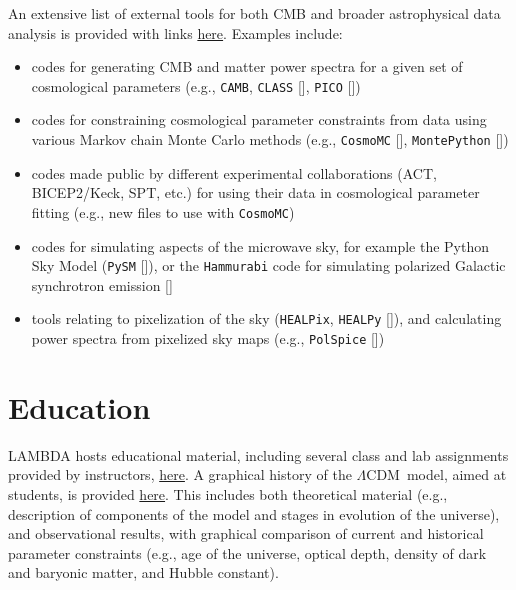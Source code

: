 \documentclass[letter]{emulateapj}
\newcommand{\lcdm}{\ensuremath{\Lambda\mathrm{CDM}}}
\begin{document}
An extensive list of external tools for both CMB and broader astrophysical data analysis is provided with links \href{https://lambda.gsfc.nasa.gov/toolbox/}{here}. Examples include:
\begin{itemize}
    \item codes for generating CMB and matter power spectra for a given set of cosmological parameters (e.g., \texttt{CAMB}, \texttt{CLASS} [], \texttt{PICO} [])
    \item codes for constraining cosmological parameter constraints from data using various Markov chain Monte Carlo methods (e.g., \texttt{CosmoMC} [], \texttt{MontePython} [])
    \item codes made public by different experimental collaborations (ACT, BICEP2/Keck, SPT, etc.) for using their data in cosmological parameter fitting (e.g., new files to use with \texttt{CosmoMC})
    \item codes for simulating aspects of the microwave sky, for example the Python Sky Model (\texttt{PySM} []), or the \texttt{Hammurabi} code for simulating polarized Galactic synchrotron emission []
    \item tools relating to pixelization of the sky (\texttt{HEALPix}, \texttt{HEALPy} []), and calculating power spectra from pixelized sky maps (e.g., \texttt{PolSpice} [])
\end{itemize}

\section{Education}

LAMBDA hosts educational material, including several class and lab assignments provided by instructors, \href{https://lambda.gsfc.nasa.gov/education/}{here}. A graphical history of the \lcdm\ model, aimed at students, is provided \href{https://lambda.gsfc.nasa.gov/education/graphic_history/}{here}. This includes both theoretical material (e.g., description of components of the model and stages in evolution of the universe), and observational results, with graphical comparison of current and historical parameter constraints (e.g., age of the universe, optical depth, density of dark and baryonic matter, and Hubble constant).
\end{document}
